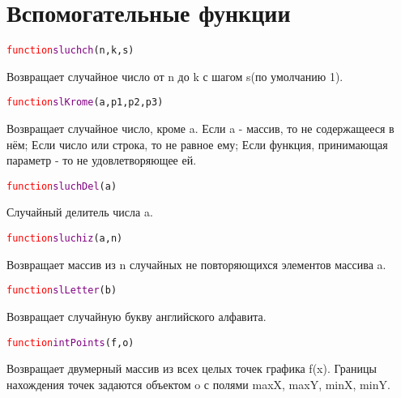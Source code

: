 	\section{Вспомогательные функции}
		\begin{alltt} 	
			\textcolor{Red}{function} \textcolor{Purple}{sluchch}(n,k,s)
		\end{alltt}
	Возвращает случайное число от n до k с шагом s(по умолчанию 1).
		\begin{alltt} 	
			\textcolor{Red}{function} \textcolor{Purple}{slKrome}(a,p1,p2,p3)
		\end{alltt}
	Возвращает случайное число, кроме a. Если a \-- массив, то не содержащееся в нём; Если число или строка, то не равное ему; Если функция, принимающая параметр - то не удовлетворяющее ей.
		\begin{alltt} 	
			\textcolor{Red}{function} \textcolor{Purple}{sluchDel}(a)
		\end{alltt}
	Случайный делитель числа a.
		\begin{alltt} 	
			\textcolor{Red}{function} \textcolor{Purple}{sluchiz}(a,n)
		\end{alltt}
	Возвращает массив из n случайных не повторяющихся элементов массива a. 
		\begin{alltt} 	
			\textcolor{Red}{function} \textcolor{Purple}{slLetter}(b)
		\end{alltt}
	Возвращает случайную букву английского алфавита.
		\begin{alltt} 	
			\textcolor{Red}{function} \textcolor{Purple}{intPoints}(f,o)
		\end{alltt}
  	Возвращает двумерный массив из всех целых точек графика f(x).  Границы нахождения точек задаются объектом o с полями maxX, maxY, minX, minY.
  	

